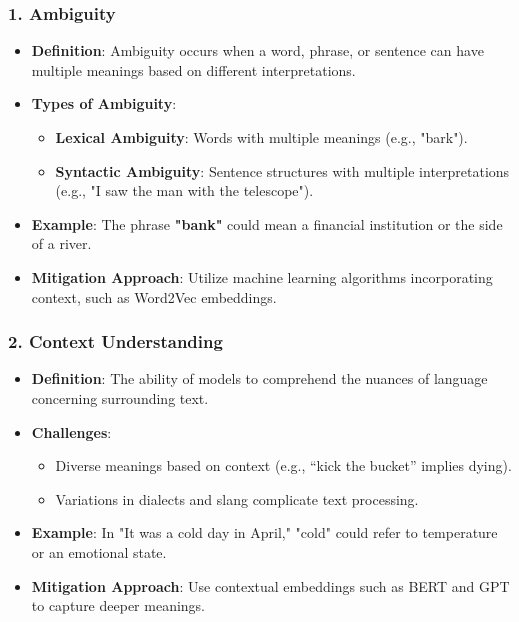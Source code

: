 \documentclass[aspectratio=169]{beamer}
\begin{document}
\begin{frame}[fragile]
    \frametitle{1. Ambiguity}
    \begin{itemize}
        \item \textbf{Definition}: Ambiguity occurs when a word, phrase, or sentence can have multiple meanings based on different interpretations.
        
        \item \textbf{Types of Ambiguity}:
        \begin{itemize}
            \item \textbf{Lexical Ambiguity}: Words with multiple meanings (e.g., "bark").
            \item \textbf{Syntactic Ambiguity}: Sentence structures with multiple interpretations (e.g., "I saw the man with the telescope").
        \end{itemize}
        
        \item \textbf{Example}: The phrase \textbf{"bank"} could mean a financial institution or the side of a river.
        
        \item \textbf{Mitigation Approach}: Utilize machine learning algorithms incorporating context, such as Word2Vec embeddings.
    \end{itemize}
\end{frame}

\begin{frame}[fragile]
    \frametitle{2. Context Understanding}
    \begin{itemize}
        \item \textbf{Definition}: The ability of models to comprehend the nuances of language concerning surrounding text.
        
        \item \textbf{Challenges}:
        \begin{itemize}
            \item Diverse meanings based on context (e.g., “kick the bucket” implies dying).
            \item Variations in dialects and slang complicate text processing.
        \end{itemize}
        
        \item \textbf{Example}: In "It was a cold day in April," "cold" could refer to temperature or an emotional state.
        
        \item \textbf{Mitigation Approach}: Use contextual embeddings such as BERT and GPT to capture deeper meanings.
    \end{itemize}
\end{frame}
\end{document}

